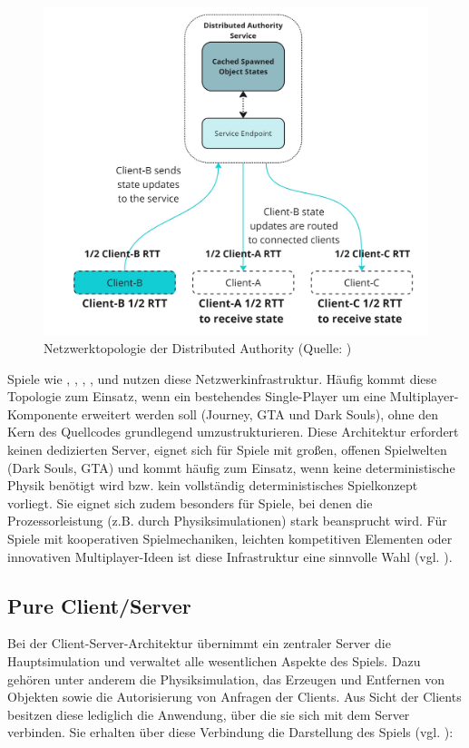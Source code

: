\begin{figure}[ht]
\centering
\includegraphics[width=1\linewidth]{content/pictures/distributed-authority-service.jpg}
\caption{Netzwerktopologie der Distributed Authority (Quelle: \cite{noauthor_distributed_2025})}
\label{fig:distributed_authority_topology}
\end{figure}

Spiele wie , , , ,  und  nutzen diese Netzwerkinfrastruktur. Häufig kommt diese Topologie zum Einsatz, wenn ein bestehendes Single-Player um eine Multiplayer-Komponente erweitert werden soll (Journey, GTA und Dark Souls), ohne den Kern des Quellcodes grundlegend umzustrukturieren. Diese Architektur erfordert keinen dedizierten Server, eignet sich für Spiele mit großen, offenen Spielwelten (Dark Souls, GTA) und kommt häufig zum Einsatz, wenn keine deterministische Physik benötigt wird bzw. kein vollständig deterministisches Spielkonzept vorliegt. Sie eignet sich zudem besonders für Spiele, bei denen die Prozessorleistung (z.B. durch Physiksimulationen) stark beansprucht wird. Für Spiele mit kooperativen Spielmechaniken, leichten kompetitiven Elementen oder innovativen Multiplayer-Ideen ist diese Infrastruktur eine sinnvolle Wahl (vgl. \cite{noauthor_choosing_2024}).

\subsection{Pure Client/Server}
Bei der Client-Server-Architektur übernimmt ein zentraler Server die Hauptsimulation und verwaltet alle wesentlichen Aspekte des Spiels. Dazu gehören unter anderem die Physiksimulation, das Erzeugen und Entfernen von Objekten sowie die Autorisierung von Anfragen der Clients. Aus Sicht der Clients besitzen diese lediglich die Anwendung, über die sie sich mit dem Server verbinden. Sie erhalten über diese Verbindung die Darstellung des Spiels (vgl. \cite{noauthor_client-server_2024}):
